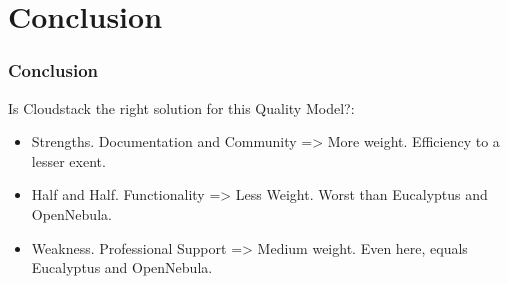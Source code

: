 \section{Conclusion}

\begin{frame}[allowframebreaks]
\frametitle{Conclusion}
Is Cloudstack the right solution for this Quality Model?:
\begin{itemize}\itemsep0pt
\item{Strengths}. Documentation and Community => More weight. Efficiency to a lesser exent.
\item{Half and Half}. Functionality => Less Weight. Worst than Eucalyptus and OpenNebula.
\item{Weakness}. Professional Support => Medium weight. Even here, equals Eucalyptus and OpenNebula.
\end{itemize}

\end{frame}
